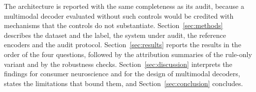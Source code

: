 The architecture is reported with the same completeness as its audit, because a multimodal decoder evaluated without such controls would be credited with mechanisms that the controls do not substantiate. Section~\ref{sec:methods} describes the dataset and the label, the system under audit, the reference encoders and the audit protocol. Section~\ref{sec:results} reports the results in the order of the four questions, followed by the attribution summaries of the rule-only variant and by the robustness checks. Section~\ref{sec:discussion} interprets the findings for consumer neuroscience and for the design of multimodal decoders, states the limitations that bound them, and Section~\ref{sec:conclusion} concludes.


